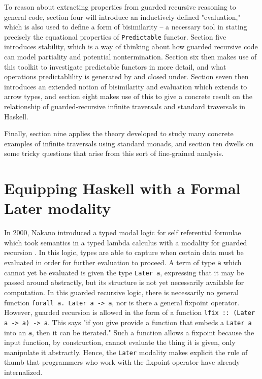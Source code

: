 \documentclass[sigplan,screen]{acmart}
\newcommand{\hs}{\texttt}
\begin{document}
To reason about extracting properties from guarded recursive reasoning to general code, section four will introduce an inductively defined "evaluation," which is also used to define a form of bisimilarity -- a necessary tool in stating precisely the equational properties of \hs{Predictable} functor. Section five introduces stability, which is a way of thinking about how guarded recursive code can model partiality and potential nontermination. Section six then makes use of this toolkit to investigate predictable functors in more detail, and what operations predictablility is generated by and closed under. Section seven then introduces an extended notion of bisimilarity and evaluation which extends to arrow types, and section eight makes use of this to give a concrete result on the relationship of guarded-recursive infinite traversals and standard traversals in Haskell. 

Finally, section nine applies the theory developed to study many concrete examples of infinite traversals using standard monads, and section ten dwells on some tricky questions that arise from this sort of fine-grained analysis.

\section{Equipping Haskell with a Formal Later modality}

In 2000, Nakano introduced a typed modal logic for self referential formulae which took semantics in a typed lambda calculus with a modality for guarded recursion \cite{nakano2000modality}. In this logic, types are able to capture when certain data must be evaluated in order for further evaluation to proceed. A term of type \hs{a} which cannot yet be evaluated is given the type \hs{Later a}, expressing that it may be passed around abstractly, but its structure is not yet necessarily available for computation. In this guarded recursive logic, there is necessarily no general function \hs{forall a. Later a -> a}, nor is there a general fixpoint operator. However, guarded recursion is allowed in the form of a function \hs{lfix :: (Later a -> a) -> a}. This says "if you give provide a function that embeds a \hs{Later a} into an \hs{a}, then it can be iterated." Such a function allows a fixpoint because the input function, by construction, cannot evaluate the thing it is given, only manipulate it abstractly. Hence, the \hs{Later} modality makes explicit the rule of thumb that programmers who work with the fixpoint operator have already internalized.
\end{document}
